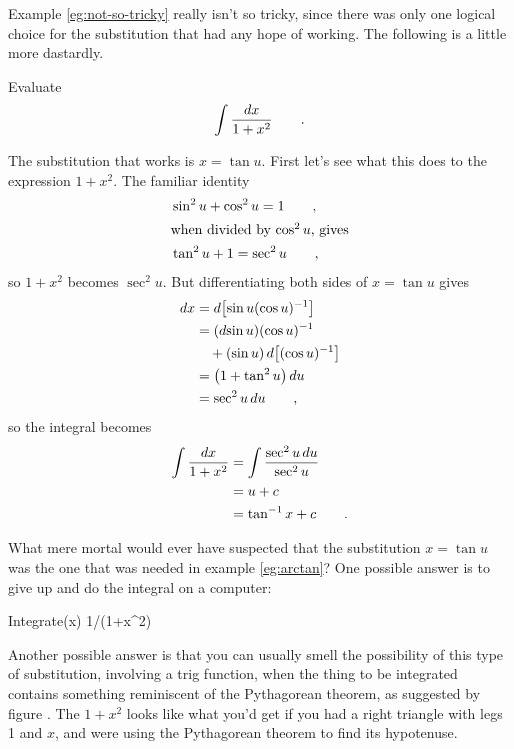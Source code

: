 Example \ref{eg:not-so-tricky} really isn't so tricky, since there was only one logical
choice for the substitution that had any hope of working. The following is a little more
dastardly.

\begin{eg}\label{eg:arctan}
\egquestion Evaluate
\begin{equation*}
  \int \frac{\mathop{d\!} x}{1+x^2} \qquad .
\end{equation*}

\eganswer The substitution that works is $x=\tan u$. First let's see what this does
to the expression $1+x^2$. The familiar identity
\begin{align*}
   &\sin^2 u + \cos^2 u = 1 \qquad ,\\
\intertext{when divided by $\cos^2 u$, gives}
   &\tan^2 u + 1 = \sec^2 u \qquad ,
\end{align*}
so $1+x^2$ becomes $\sec^2 u$.
But differentiating both sides of $x=\tan u$ gives
\begin{align*}
  \mathop{d\!} x &= \mathop{d\!} \left[\sin u(\cos u)^{-1}\right] \\
         &= (\mathop{d\!}\sin u)(\cos u)^{-1}\\
         &  \quad +(\sin u)\mathop{d\!}\left[(\cos u)^{-1}\right] \\
         &= \left(1+\tan^2 u\right)\mathop{d\!} u \\
         &= \sec^2 u\mathop{d\!} u \qquad , 
\end{align*}
so the integral becomes
\begin{align*}
  \int \frac{\mathop{d\!} x}{1+x^2} &= \int \frac{\sec^2 u \mathop{d\!} u}{\sec^2 u} \\
           &= u+c \\
           &= \tan^{-1} x+c \qquad .
\end{align*}
\end{eg}
%
What mere mortal would ever have suspected that the substitution $x=\tan u$ was
the one that was needed in example \ref{eg:arctan}? One possible answer is to
give up and do the integral on a computer:

\begin{Code}
  \ii Integrate(x) 1/(1+x^2)
\end{Code}

Another possible answer is that you can usually smell the possibility of
this type of substitution, involving a trig function, when the thing to be
integrated contains something reminiscent of the Pythagorean theorem, as
suggested by figure . The $1+x^2$ looks like what
you'd get if you had a right triangle with legs 1 and $x$, and were using the
Pythagorean theorem to find its hypotenuse.
%


